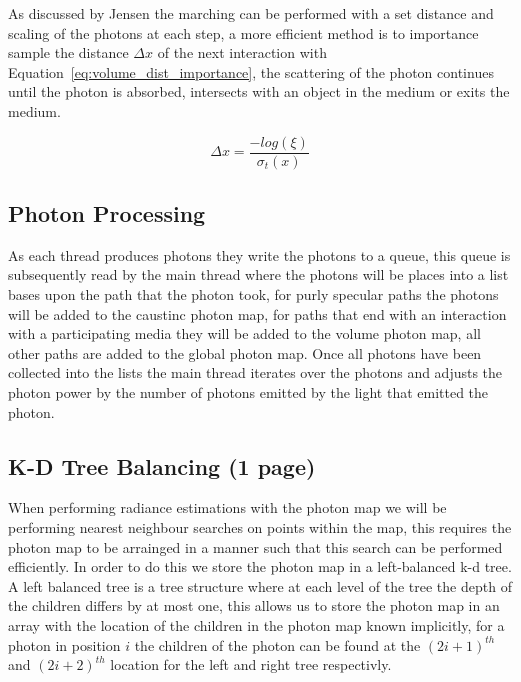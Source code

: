 As discussed by Jensen  the marching can be performed with a set distance and scaling of the photons at each
step, a more efficient method is to importance sample the distance $\Delta x$ of the next interaction with 
Equation~\ref{eq:volume_dist_importance}, the scattering of the photon continues until the photon is absorbed, intersects
with an object in the medium or exits the medium.

\begin{equation}
\Delta x = \frac{-log(\xi)}{\sigma_t(x)}
\label{eq:volum_dist_importance}
\end{equation}

\subsection{Photon Processing}
As each thread produces photons they write the photons to a queue, this queue is subsequently read by the main thread where
the photons will be places into a list bases upon the path that the photon took, for purly specular paths the photons
will be added to the caustinc photon map, for paths that end with an interaction with a participating media they will be
added to the volume photon map, all other paths are added to the global photon map. Once all photons have been collected
into the lists the main thread iterates over the photons and adjusts the photon power by the number of photons emitted by
the light that emitted the photon. 

\subsection{K-D Tree Balancing (1 page)}
When performing radiance estimations with the photon map we will be performing nearest neighbour searches on points within
the map, this requires the photon map to be arrainged in a manner such that this search can be performed efficiently.
In order to do this we store the photon map in a left-balanced k-d tree. A left balanced tree is a tree structure where
at each level of the tree the depth of the children differs by at most one, 
this allows us to store the photon map in an array with the location of the children in the photon map known implicitly,
for a photon in position $i$ the children of the photon can be found at the $(2i + 1)^{th}$ and $(2i + 2)^{th}$
location for the left and right tree respectivly.

